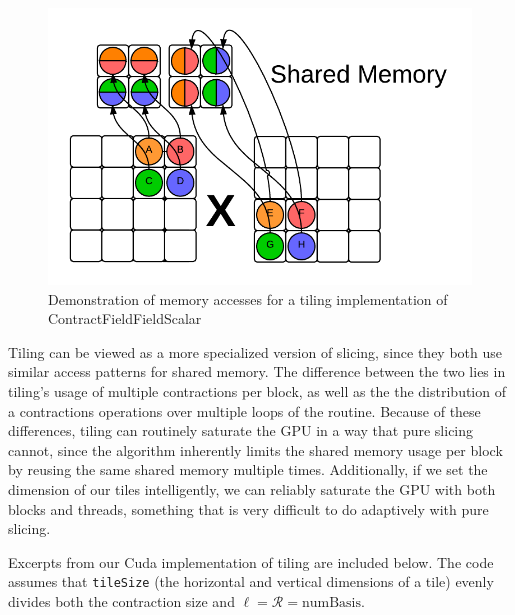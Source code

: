 \begin{figure}[ht]
    \centering
    \includegraphics[scale = .7]{ContractFieldFieldScalarGraphicTiling2}
    \caption{Demonstration of memory accesses for a tiling implementation of ContractFieldFieldScalar}
\label{fig:Tiling2}
\end{figure}

    Tiling can be viewed as a more specialized version of slicing, since they
both use similar access patterns for shared memory. The difference between the
two lies in tiling's usage of multiple contractions per block, as well as the
the distribution of a contractions operations over multiple loops of the
routine. Because of these differences, tiling can routinely saturate the GPU in
a way that pure slicing cannot, since the algorithm inherently limits the
shared memory usage per block by reusing the same shared memory multiple times.
Additionally, if we set the dimension of our tiles intelligently, we can
reliably saturate the GPU with both blocks and threads, something that is very
difficult to do adaptively with pure slicing. 
	
    Excerpts from our Cuda implementation of tiling are included below. The
code assumes that \texttt{tileSize} (the horizontal and vertical dimensions of a tile)
evenly divides both the contraction size and $\ell = \mathcal{R} =
\text{numBasis}$.
	

